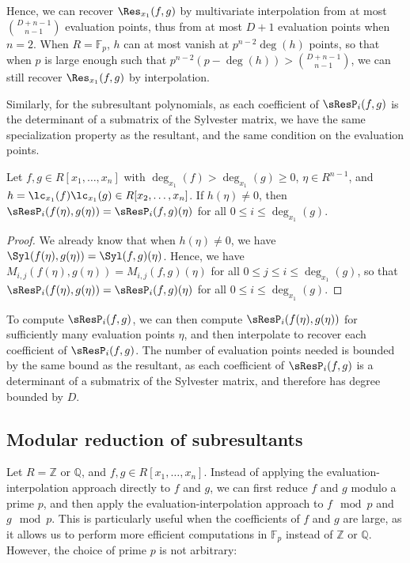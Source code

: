 Hence, we can recover $\Res_{x_1}(f,g)$ by multivariate interpolation from at most $\binom{D + n-1}{n-1}$ evaluation points, thus from at most $D + 1$ evaluation points when $n=2$. When $R=\mathbb{F}_p$, $h$ can at most vanish at $p^{n-2}\deg(h)$ points, so that when $p$ is large enough such that $p^{n-2}(p-\deg(h))>\binom{D + n-1}{n-1}$, we can still recover $\Res_{x_1}(f,g)$ by interpolation.

Similarly, for the subresultant polynomials, as each coefficient of $\sResP_i(f,g)$ is the determinant of a submatrix of the Sylvester matrix, we have the same specialization property as the resultant, and the same condition on the evaluation points.

\begin{proposition}
    Let $f,g\in R[x_1,\dots,x_n]$ with $\deg_{x_1}(f)>\deg_{x_1}(g)\geq 0$, $\eta\in R^{n-1}$, and $h=\lc_{x_1}(f)\lc_{x_1}(g)\in R[x_2,\dots,x_n]$. If $h(\eta)\neq 0$, then $\sResP_i(f(\eta),g(\eta))=\sResP_i(f,g)(\eta)$ for all $0\leq i\leq\deg_{x_1}(g)$.
\end{proposition}

\begin{proof}
    We already know that when $h(\eta)\neq 0$, we have $\Syl(f(\eta),g(\eta))=\Syl(f,g)(\eta)$. Hence, we have $M_{i,j}(f(\eta),g(\eta))=M_{i,j}(f,g)(\eta)$ for all $0\leq j\leq i\leq\deg_{x_1}(g)$, so that $\sResP_i(f(\eta),g(\eta))=\sResP_i(f,g)(\eta)$ for all $0\leq i\leq\deg_{x_1}(g)$.
\end{proof}

To compute $\sResP_i(f,g)$, we can then compute $\sResP_i(f(\eta),g(\eta))$ for sufficiently many evaluation points $\eta$, and then interpolate to recover each coefficient of $\sResP_i(f,g)$. The number of evaluation points needed is bounded by the same bound as the resultant, as each coefficient of $\sResP_i(f,g)$ is a determinant of a submatrix of the Sylvester matrix, and therefore has degree bounded by $D$.

\subsection{Modular reduction of subresultants}

Let $R=\mathbb{Z}$ or $\mathbb{Q}$, and $f,g\in R[x_1,\dots,x_n]$. Instead of applying the evaluation-interpolation approach directly to $f$ and $g$, we can first reduce $f$ and $g$ modulo a prime $p$, and then apply the evaluation-interpolation approach to $f\mod p$ and $g\mod p$. This is particularly useful when the coefficients of $f$ and $g$ are large, as it allows us to perform more efficient computations in $\mathbb{F}_p$ instead of $\mathbb{Z}$ or $\mathbb{Q}$. However, the choice of prime $p$ is not arbitrary:

